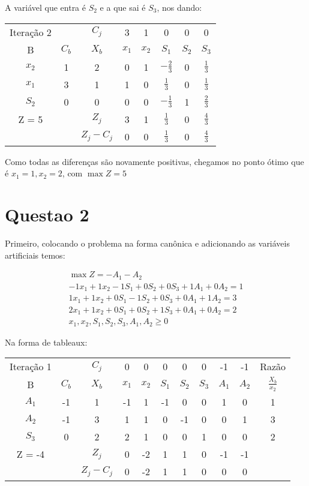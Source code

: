 \documentclass[11pt]{article}
\begin{document}
A variável que entra é \(S_2\) e a que sai é \(S_3\), nos dando:

\begin{center}
\begin{tabular}{c c c c c c c c}
Iteração 2 &  & \(C_j\) & 3 & 1 & 0 & 0 & 0\\
B & \(C_b\) & \(X_b\) & \(x_1\) & \(x_2\) & \(S_1\) & \(S_2\) & \(S_3\)\\
\(x_2\) & 1 & 2 & 0 & 1 & \(-\frac{2}{3}\) & 0 & \(\frac{1}{3}\)\\
\(x_1\) & 3 & 1 & 1 & 0 & \(\frac{1}{3}\) & 0 & \(\frac{1}{3}\)\\
\(S_2\) & 0 & 0 & 0 & 0 & \(-\frac{1}{3}\) & 1 & \(\frac{2}{3}\)\\
Z = 5 &  & \(Z_j\) & 3 & 1 & \(\frac{1}{3}\) & 0 & \(\frac{4}{3}\)\\
 &  & \(Z_j-C_j\) & 0 & 0 & \(\frac{1}{3}\) & 0 & \(\frac{4}{3}\)\\
\end{tabular}
\end{center}

Como todas as diferenças são novamente positivas, chegamos no ponto ótimo que é \(x_1=1, x_2=2\), com \(\max Z = 5\)

\section{Questao 2}
\label{sec:org87e2167}
Primeiro, colocando o problema na forma canônica e adicionando as variáveis artificiais temos:

\begin{align*}
  \max Z = -A_{1} -A_{2}\\
  -1x_{1}+1x_{2}-1S_{1}+0S_{2}+0S_{3}+1A_{1}+0A_{2} = 1\\
  1x_{1}+1x_{2}+0S_{1}-1S_{2}+0S_{3}+0A_{1}+1A_{2} = 3\\
  2x_{1}+1x_{2}+0S_{1}+0S_{2}+1S_{3}+0A_{1}+0A_{2} = 2\\
  x_{1},x_{2},S_{1},S_{2},S_{3},A_{1},A_{2} \geq 0
\end{align*}

Na forma de tableaux:

\begin{center}
\begin{tabular}{c c c c c c c c c c c}
Iteração 1 &  & \(C_j\) & 0 & 0 & 0 & 0 & 0 & -1 & -1 & Razão\\
B & \(C_b\) & \(X_b\) & \(x_1\) & \(x_2\) & \(S_1\) & \(S_2\) & \(S_3\) & \(A_1\) & \(A_2\) & \(\frac{X_b}{x_2}\)\\
\(A_1\) & -1 & 1 & -1 & 1 & -1 & 0 & 0 & 1 & 0 & 1\\
\(A_2\) & -1 & 3 & 1 & 1 & 0 & -1 & 0 & 0 & 1 & 3\\
\(S_3\) & 0 & 2 & 2 & 1 & 0 & 0 & 1 & 0 & 0 & 2\\
Z = -4 &  & \(Z_j\) & 0 & -2 & 1 & 1 & 0 & -1 & -1 & \\
 &  & \(Z_j-C_j\) & 0 & -2 & 1 & 1 & 0 & 0 & 0 & \\
\end{tabular}
\end{center}
\end{document}
